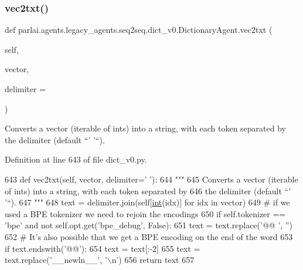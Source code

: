 \subsubsection{\texorpdfstring{vec2txt()}{vec2txt()}}
{\footnotesize\ttfamily def parlai.\+agents.\+legacy\+\_\+agents.\+seq2seq.\+dict\+\_\+v0.\+Dictionary\+Agent.\+vec2txt (\begin{DoxyParamCaption}\item[{}]{self,  }\item[{}]{vector,  }\item[{}]{delimiter = {\ttfamily \textquotesingle{}~\textquotesingle{}} }\end{DoxyParamCaption})}

\begin{DoxyVerb}Converts a vector (iterable of ints) into a string, with each token separated by
the delimiter (default ``' '``).
\end{DoxyVerb}
 

Definition at line 643 of file dict\+\_\+v0.\+py.


\begin{DoxyCode}
643     \textcolor{keyword}{def }vec2txt(self, vector, delimiter=' '):
644         \textcolor{stringliteral}{"""}
645 \textcolor{stringliteral}{        Converts a vector (iterable of ints) into a string, with each token separated by}
646 \textcolor{stringliteral}{        the delimiter (default ``' '``).}
647 \textcolor{stringliteral}{        """}
648         text = delimiter.join(self[\hyperlink{namespacelanguage__model_1_1eval__ppl_a7d12ee00479673c5c8d1f6d01faa272a}{int}(idx)] \textcolor{keywordflow}{for} idx \textcolor{keywordflow}{in} vector)
649         \textcolor{comment}{# if we used a BPE tokenizer we need to rejoin the encodings}
650         \textcolor{keywordflow}{if} self.tokenizer == \textcolor{stringliteral}{'bpe'} \textcolor{keywordflow}{and} \textcolor{keywordflow}{not} self.opt.get(\textcolor{stringliteral}{'bpe\_debug'}, \textcolor{keyword}{False}):
651             text = text.replace(\textcolor{stringliteral}{'@@ '}, \textcolor{stringliteral}{''})
652             \textcolor{comment}{# It's also possible that we get a BPE encoding on the end of the word}
653             \textcolor{keywordflow}{if} text.endswith(\textcolor{stringliteral}{'@@'}):
654                 text = text[:-2]
655             text = text.replace(\textcolor{stringliteral}{'\_\_newln\_\_'}, \textcolor{stringliteral}{'\(\backslash\)n'})
656         \textcolor{keywordflow}{return} text
657 
\end{DoxyCode}


